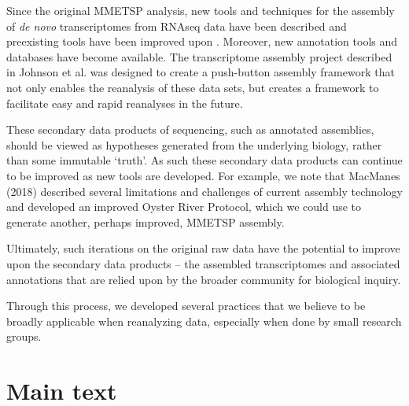 \documentclass[12pt]{article}
\begin{document}
Since the original MMETSP analysis, new tools and techniques for the assembly of {\em de novo} transcriptomes from RNAseq data have been described and preexisting tools have been improved upon \cite{Grabherr2011}. Moreover, new annotation tools and databases have become available. The transcriptome assembly project described in Johnson et al. \cite{Johnson2018} was designed to create a push-button assembly framework that not only enables the reanalysis of these data sets, but creates a framework to facilitate easy and rapid reanalyses in the future.

These secondary data products of sequencing, such as annotated
assemblies, should be viewed as hypotheses generated from the
underlying biology, rather than some immutable `truth'. As such these
secondary data products can continue to be improved as new tools are
developed.  For example, we note that MacManes (2018) described several
limitations and challenges of current assembly technology and developed
an improved Oyster River Protocol, which we could use to generate another,
perhaps improved, MMETSP assembly.

Ultimately, such iterations on the original raw data have the
potential to improve upon the secondary data products -- the assembled
transcriptomes and associated annotations that are relied upon by the
broader community for biological inquiry.

Through this process, we developed several practices that we believe
to be broadly applicable when reanalyzing data, especially when done
by small research groups.


\section{Main text}
\end{document}
